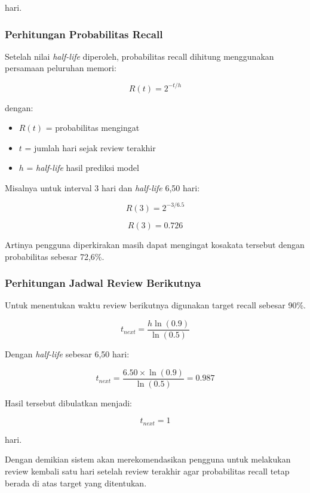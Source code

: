 hari.

\subsubsection{Perhitungan Probabilitas Recall}

Setelah nilai \textit{half-life} diperoleh, probabilitas recall dihitung menggunakan persamaan peluruhan memori:

\begin{equation}
R(t)
=
2^{-t/h}
\end{equation}

dengan:

\begin{itemize}
    \item $R(t)$ = probabilitas mengingat
    \item $t$ = jumlah hari sejak review terakhir
    \item $h$ = \textit{half-life} hasil prediksi model
\end{itemize}

Misalnya untuk interval 3 hari dan \textit{half-life} 6,50 hari:

\begin{equation}
R(3)
=
2^{-3/6.5}
\end{equation}

\begin{equation}
R(3)
=
0.726
\end{equation}

Artinya pengguna diperkirakan masih dapat mengingat kosakata tersebut dengan probabilitas sebesar 72,6\%.

\subsubsection{Perhitungan Jadwal Review Berikutnya}

Untuk menentukan waktu review berikutnya digunakan target recall sebesar 90\%.

\begin{equation}
t_{next}
=
\frac
{h\ln(0.9)}
{\ln(0.5)}
\end{equation}

Dengan \textit{half-life} sebesar 6,50 hari:

\begin{equation}
t_{next}
=
\frac
{6.50\times\ln(0.9)}
{\ln(0.5)}
=
0.987
\end{equation}

Hasil tersebut dibulatkan menjadi:

\begin{equation}
t_{next}
=
1
\end{equation}

hari.

Dengan demikian sistem akan merekomendasikan pengguna untuk melakukan review kembali satu hari setelah review terakhir agar probabilitas recall tetap berada di atas target yang ditentukan.

